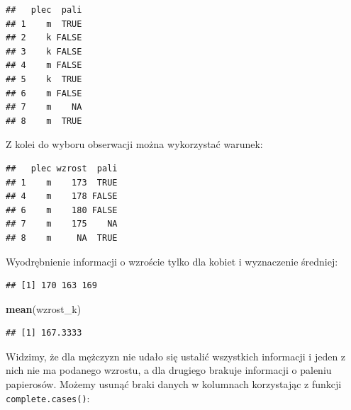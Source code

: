 \documentclass[]{book}
\newenvironment{Shaded}{\begin{snugshade}}{\end{snugshade}}
\newcommand{\KeywordTok}[1]{\textcolor[rgb]{0.13,0.29,0.53}{\textbf{#1}}}
\newcommand{\StringTok}[1]{\textcolor[rgb]{0.31,0.60,0.02}{#1}}
\newcommand{\CommentTok}[1]{\textcolor[rgb]{0.56,0.35,0.01}{\textit{#1}}}
\newcommand{\OperatorTok}[1]{\textcolor[rgb]{0.81,0.36,0.00}{\textbf{#1}}}
\newcommand{\NormalTok}[1]{#1}
\begin{document}
\begin{verbatim}
##   plec  pali
## 1    m  TRUE
## 2    k FALSE
## 3    k FALSE
## 4    m FALSE
## 5    k  TRUE
## 6    m FALSE
## 7    m    NA
## 8    m  TRUE
\end{verbatim}

Z kolei do wyboru obserwacji można wykorzystać warunek:

\begin{Shaded}
\end{Shaded}

\begin{verbatim}
##   plec wzrost  pali
## 1    m    173  TRUE
## 4    m    178 FALSE
## 6    m    180 FALSE
## 7    m    175    NA
## 8    m     NA  TRUE
\end{verbatim}

Wyodrębnienie informacji o wzroście tylko dla kobiet i wyznaczenie
średniej:

\begin{Shaded}
\end{Shaded}

\begin{verbatim}
## [1] 170 163 169
\end{verbatim}

\begin{Shaded}
\begin{Highlighting}[]
\KeywordTok{mean}\NormalTok{(wzrost_k)}
\end{Highlighting}
\end{Shaded}

\begin{verbatim}
## [1] 167.3333
\end{verbatim}

Widzimy, że dla mężczyzn nie udało się ustalić wszystkich informacji i
jeden z nich nie ma podanego wzrostu, a dla drugiego brakuje informacji
o paleniu papierosów. Możemy usunąć braki danych w kolumnach korzystając
z funkcji \texttt{complete.cases()}:

\begin{Shaded}
\end{Shaded}
\end{document}
